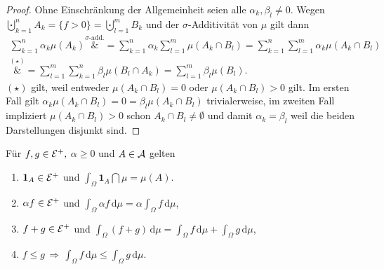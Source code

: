 \begin{proof}
	Ohne Einschr\"ankung der Allgemeinheit seien alle $\alpha_k, \beta_l \neq 0$. Wegen $\bigcupdot_{k=1}^n A_k=\{f>0\}=\bigcupdot_{l=1}^mB_k$ und der $\sigma$-Additivit\"at von $\mu$ gilt dann	\begin{align*}
		\sum\limits_{k = 1}^{n} \alpha_k \mu(A_k) \overset{\sigma\text{-add.}}&{=} \sum\limits_{k = 1}^{n} \alpha_k \sum\limits_{l = 1}^{m} \mu(A_k \cap B_l) =\sum\limits_{k = 1}^{n} \sum\limits_{l = 1}^{m} \alpha_k\mu(A_k \cap B_l)\\
		\overset{(\star)}&{=}  \sum\limits_{l = 1}^{m} \sum\limits_{k = 1}^{n}\beta_l \mu(B_l \cap A_k) = \sum\limits_{l = 1}^{m} \beta_l \mu(B_l).
	\end{align*}
	$(\star)$ gilt, weil entweder $\mu(A_k\cap B_l)=0$ oder $\mu(A_k\cap B_l)>0$ gilt. Im ersten Fall gilt  $\alpha_k\mu(A_k\cap B_l)=0=\beta_l\mu(A_k\cap B_l)$ trivialerweise, im zweiten Fall impliziert $\mu(A_k\cap B_l)>0$ schon $A_k \cap B_l \neq \emptyset$ und damit $\alpha_k=\beta_l$ weil die beiden Darstellungen disjunkt sind.
\end{proof}

\begin{lemma}
	Für $f,g \in \mathcal{E}^+,$ $ \alpha \geq 0$ und $A\in \mathcal{A}$ gelten
	\begin{enumerate}[label=(\roman*)]
		\item $\mathbf{1}_A \in \mathcal{E}^+$ und $\int_\Omega \mathbf 1_A\dint \mu=\mu(A)$.
		\item $\alpha f \in \mathcal{E}^+$ und $\int_{\Omega} \alpha f \, \mathrm{d}\mu = \alpha \int_{\Omega} f\,  \mathrm{d}\mu$,
		\item $ f + g \in \mathcal{E}^+$ und $\int_{\Omega}(f + g) \,\mathrm{d}\mu = \int_{\Omega} f\, \mathrm{d}\mu + \int_{\Omega} g \,\mathrm{d}\mu$,
		\item $ f \leq g \,\Rightarrow\, \int_{\Omega} f \,\mathrm{d}\mu \leq \int_{\Omega} g\, \mathrm{d}\mu$.
 	\end{enumerate}
\end{lemma}

